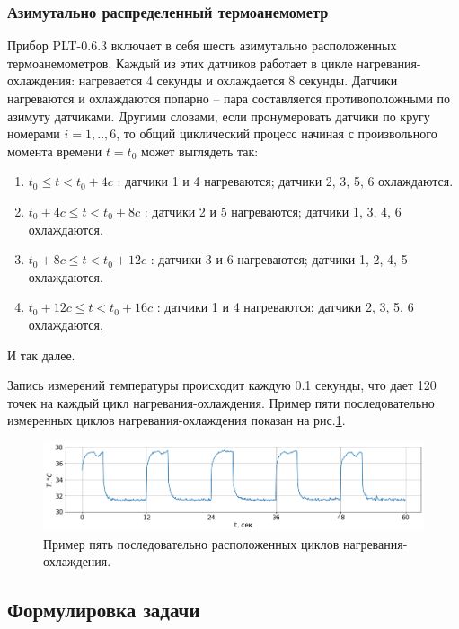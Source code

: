 \subsubsection{Азимутально распределенный термоанемометр}
\par
Прибор PLT-0.6.3 включает в себя шесть азимутально расположенных термоанемометров. Каждый из этих датчиков работает в цикле нагревания-охлаждения: нагревается 4 секунды и охлаждается 8 секунды. Датчики нагреваются и охлаждаются попарно – пара составляется противоположными по азимуту датчиками. Другими словами, если пронумеровать датчики по кругу номерами $i=1,..,6$, то общий циклический процесс начиная с произвольного момента времени $t=t_0$ может выглядеть так:
\begin{enumerate}[label=\arabic*.]
    \item $t_0 \leq t < t_0+4c$ : датчики 1 и 4 нагреваются; датчики 2, 3, 5, 6 охлаждаются.
    \item $t_0+4c \leq t < t_0+8c$ : датчики 2 и 5 нагреваются; датчики 1, 3, 4, 6 охлаждаются.
    \item $t_0+8c \leq t < t_0+12c$ : датчики 3 и 6 нагреваются; датчики 1, 2, 4, 5 охлаждаются.
    \item $t_0+12c \leq t < t_0+16c$ : датчики 1 и 4 нагреваются; датчики 2, 3, 5, 6 охлаждаются, 
\end{enumerate}
И так далее.
\par
Запись измерений температуры происходит каждую 0.1 секунды, что дает 120 точек на каждый цикл нагревания-охлаждения. Пример пяти последовательно измеренных циклов нагревания-охлаждения показан на рис.\ref{fig:cycle_examples}.

\newpage
\begin{figure}[H]
\centering
\includegraphics[width=1.0\textwidth]{TA/cycle_examples.png}
\caption{Пример пять последовательно расположенных циклов нагревания-охлаждения.}
\label{fig:cycle_examples}
\end{figure}


\subsection{Формулировка задачи}
